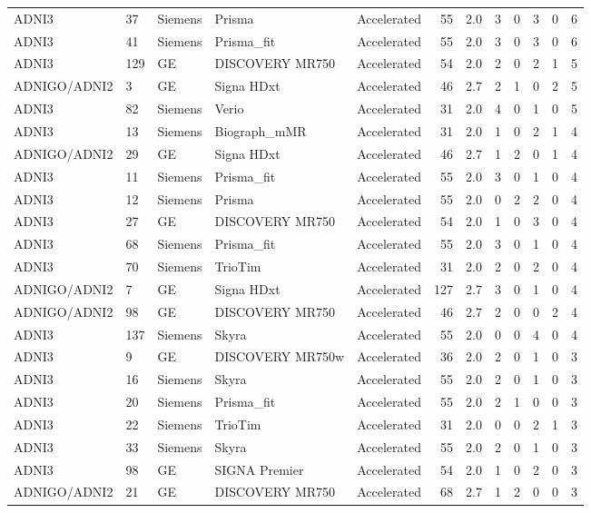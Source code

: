\documentclass{article}
\begin{document}
\begin{landscape}
\begin{longtable}{lllllrrrrrrr}
ADNI3 & 37 & Siemens & Prisma & Accelerated & 55 & 2.0 & 3 & 0 & 3 & 0 & 6 \\
ADNI3 & 41 & Siemens & Prisma\_fit & Accelerated & 55 & 2.0 & 3 & 0 & 3 & 0 & 6 \\
ADNI3 & 129 & GE & DISCOVERY MR750 & Accelerated & 54 & 2.0 & 2 & 0 & 2 & 1 & 5 \\
ADNIGO/ADNI2 & 3 & GE & Signa HDxt & Accelerated & 46 & 2.7 & 2 & 1 & 0 & 2 & 5 \\
ADNI3 & 82 & Siemens & Verio & Accelerated & 31 & 2.0 & 4 & 0 & 1 & 0 & 5 \\
ADNI3 & 13 & Siemens & Biograph\_mMR & Accelerated & 31 & 2.0 & 1 & 0 & 2 & 1 & 4 \\
ADNIGO/ADNI2 & 29 & GE & Signa HDxt & Accelerated & 46 & 2.7 & 1 & 2 & 0 & 1 & 4 \\
ADNI3 & 11 & Siemens & Prisma\_fit & Accelerated & 55 & 2.0 & 3 & 0 & 1 & 0 & 4 \\
ADNI3 & 12 & Siemens & Prisma & Accelerated & 55 & 2.0 & 0 & 2 & 2 & 0 & 4 \\
ADNI3 & 27 & GE & DISCOVERY MR750 & Accelerated & 54 & 2.0 & 1 & 0 & 3 & 0 & 4 \\
ADNI3 & 68 & Siemens & Prisma\_fit & Accelerated & 55 & 2.0 & 3 & 0 & 1 & 0 & 4 \\
ADNI3 & 70 & Siemens & TrioTim & Accelerated & 31 & 2.0 & 2 & 0 & 2 & 0 & 4 \\
ADNIGO/ADNI2 & 7 & GE & Signa HDxt & Accelerated & 127 & 2.7 & 3 & 0 & 1 & 0 & 4 \\
ADNIGO/ADNI2 & 98 & GE & DISCOVERY MR750 & Accelerated & 46 & 2.7 & 2 & 0 & 0 & 2 & 4 \\
ADNI3 & 137 & Siemens & Skyra & Accelerated & 55 & 2.0 & 0 & 0 & 4 & 0 & 4 \\
ADNI3 & 9 & GE & DISCOVERY MR750w & Accelerated & 36 & 2.0 & 2 & 0 & 1 & 0 & 3 \\
ADNI3 & 16 & Siemens & Skyra & Accelerated & 55 & 2.0 & 2 & 0 & 1 & 0 & 3 \\
ADNI3 & 20 & Siemens & Prisma\_fit & Accelerated & 55 & 2.0 & 2 & 1 & 0 & 0 & 3 \\
ADNI3 & 22 & Siemens & TrioTim & Accelerated & 31 & 2.0 & 0 & 0 & 2 & 1 & 3 \\
ADNI3 & 33 & Siemens & Skyra & Accelerated & 55 & 2.0 & 2 & 0 & 1 & 0 & 3 \\
ADNI3 & 98 & GE & SIGNA Premier & Accelerated & 54 & 2.0 & 1 & 0 & 2 & 0 & 3 \\
ADNIGO/ADNI2 & 21 & GE & DISCOVERY MR750 & Accelerated & 68 & 2.7 & 1 & 2 & 0 & 0 & 3 \\

\end{longtable}
\end{landscape}
\end{document}

